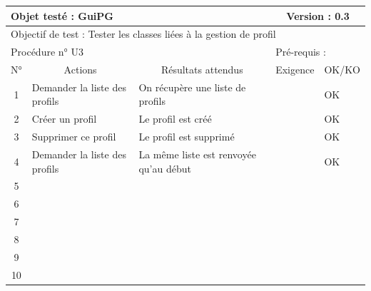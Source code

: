 \documentclass{../res/univ-projet}
\begin{document}
\begin{center}
    \begin{tabular}{|c|p{5cm}|p{5cm}|p{1.5cm}|p{1.5cm}|}
      \hline
      \multicolumn{3}{|l|}{Objet testé : GuiPG} & \multicolumn{2}{c|}{Version : 0.3}\\ \hline
      \multicolumn{5}{|l|}{Objectif de test : Tester les classes liées à la gestion de profil}\\ \hline
      \multicolumn{3}{|l|}{Procédure n° U3} & \multicolumn{2}{p{3cm}|}{Pré-requis : }\\ \hline
      \multicolumn{1}{|c|}{N°} & \multicolumn{1}{c|}{Actions} & \multicolumn{1}{c|}{Résultats attendus} & 
      \multicolumn{1}{c|}{Exigence} & \multicolumn{1}{c|}{OK/KO}\\ \hline
      1 & Demander la liste des profils & On récupère une liste de profils &  & OK \\
      2 & Créer un profil & Le profil est créé &  & OK \\
      3 & Supprimer ce profil & Le profil est supprimé &  & OK \\ 
      4 & Demander la liste des profils & La même liste est renvoyée qu'au début &  & OK \\
      5 &  &  &  & \\
      6 &  &  &  & \\
      7 &  &  &  & \\
      8 &  &  &  & \\
      9 &  &  &  & \\
      10 &  &  &  &\\ 
  \hline
    \end{tabular}
    \vskip 2.2cm



\end{center}
\end{document}

